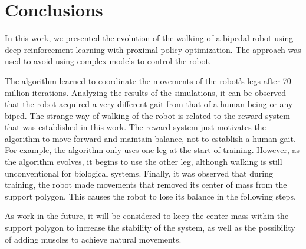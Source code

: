 \section{Conclusions}

In this work, we presented the evolution of the walking of a bipedal robot using deep reinforcement learning with proximal policy optimization. The approach was used to avoid using complex models to control the robot.

The algorithm learned to coordinate the movements of the robot's legs after 70 million iterations. Analyzing the results of the simulations, it can be observed that the robot acquired a very different gait from that of a human being or any biped. The strange way of walking of the robot is related to the reward system that was established in this work. The reward system just motivates the algorithm to move forward and maintain balance, not to establish a human gait. For example, the algorithm only uses one leg at the start of training. However, as the algorithm evolves, it begins to use the other leg, although walking is still unconventional for biological systems. Finally, it was observed that during training, the robot made movements that removed its center of mass from the support polygon. This causes the robot to lose its balance in the following steps.

As work in the future, it will be considered to keep the center mass within the support polygon to increase the stability of the system, as well as the possibility of adding muscles to achieve natural movements.


